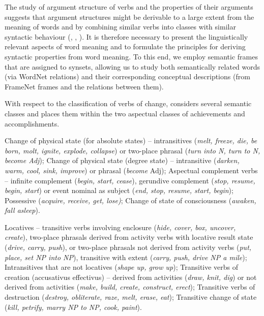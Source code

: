 \documentclass[output=paper,colorlinks,citecolor=brown]{langscibook}
\begin{document}
The study of argument structure of verbs and the properties of their arguments suggests that argument structures might be derivable to a large extent from the meaning of words and by combining similar verbs into classes with similar syntactic behaviour (\cite[1--3]{Levin1993}, \cite[4--7]{Pinker1989}, \cite[11--12]{Chomsky1986}). It is therefore necessary to present the linguistically relevant aspects of word meaning and to formulate the principles for deriving syntactic properties from word meaning. To this end, we employ semantic frames that are assigned to synsets, allowing us to study both semantically related words (via WordNet relations) and their corresponding conceptual descriptions (from FrameNet frames and the relations between them).

\largerpage
With respect to the classification of verbs of change, \citet[66--78]{Dowty1979} considers several semantic classes and places them within the two aspectual classes of achievements and accomplishments.

\begin{description}[font=\normalfont]\sloppy
\item[\emph{Achievements} (may be coextensive with inchoative):] Change of physical state (for absolute states) -- intransitives (\textit{melt, freeze, die, be born, molt, ignite, explode, collapse}) or two-place phrasal (\textit{turn into N, turn to N, become Adj}); Change of physical state (degree state) -- intransitive (\textit{darken, warm, cool, sink, improve}) or phrasal (\textit{become} Adj); Aspectual complement verbs -- infinite complement (\textit{begin, start, cease}), gerundive complement (\textit{stop, resume, begin, start}) or event nominal as subject (\textit{end, stop, resume, start, begin}); Possessive (\textit{acquire, receive, get, lose)}; Change of state of consciousness (\textit{awaken, fall asleep}).

\item[\emph{Accomplishments}:] Locatives -- transitive verbs involving enclosure (\textit{hide, cover, box, uncover, create}), two-place phrasals derived from activity verbs with locative result state (\textit{drive, carry, push}), or two-place phrasals not derived from activity verbs (\textit{put, place, set NP into NP}), transitive with extent (\textit{carry, push, drive NP a mile}); Intransitives that are not locatives (\textit{shape up, grow up}); Transitive verbs of creation (accusativus effectivus) -- derived from activities (\textit{draw, knit, dig}) or not derived from activities (\textit{make, build, create, construct, erect}); Transitive verbs of destruction (\textit{destroy, obliterate, raze, melt, erase, eat}); Transitive change of state (\textit{kill, petrify, marry NP to NP, cook, paint}).
\end{description}
\end{document}
